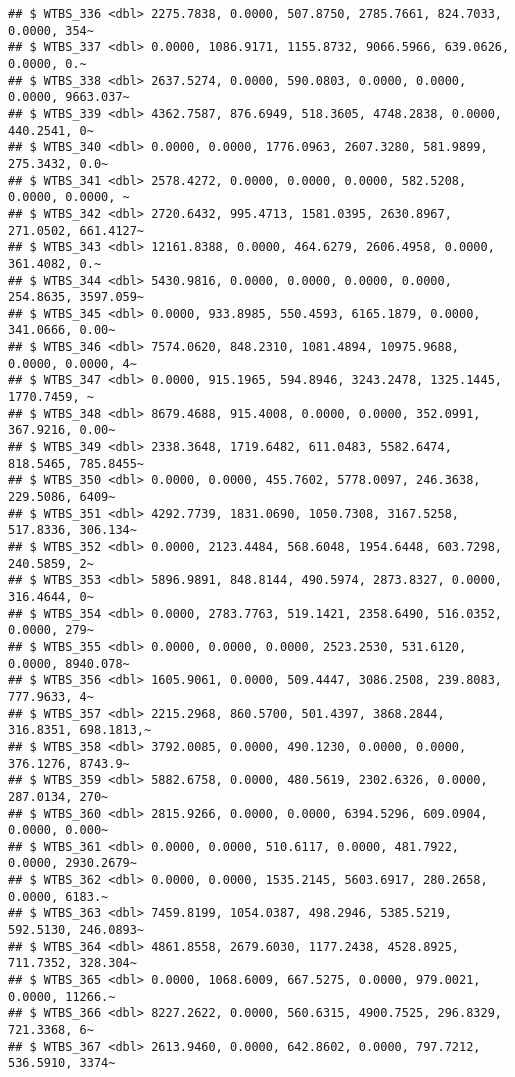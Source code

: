 \documentclass[
]{article}
\begin{document}
\begin{verbatim}
## $ WTBS_336 <dbl> 2275.7838, 0.0000, 507.8750, 2785.7661, 824.7033, 0.0000, 354~
## $ WTBS_337 <dbl> 0.0000, 1086.9171, 1155.8732, 9066.5966, 639.0626, 0.0000, 0.~
## $ WTBS_338 <dbl> 2637.5274, 0.0000, 590.0803, 0.0000, 0.0000, 0.0000, 9663.037~
## $ WTBS_339 <dbl> 4362.7587, 876.6949, 518.3605, 4748.2838, 0.0000, 440.2541, 0~
## $ WTBS_340 <dbl> 0.0000, 0.0000, 1776.0963, 2607.3280, 581.9899, 275.3432, 0.0~
## $ WTBS_341 <dbl> 2578.4272, 0.0000, 0.0000, 0.0000, 582.5208, 0.0000, 0.0000, ~
## $ WTBS_342 <dbl> 2720.6432, 995.4713, 1581.0395, 2630.8967, 271.0502, 661.4127~
## $ WTBS_343 <dbl> 12161.8388, 0.0000, 464.6279, 2606.4958, 0.0000, 361.4082, 0.~
## $ WTBS_344 <dbl> 5430.9816, 0.0000, 0.0000, 0.0000, 0.0000, 254.8635, 3597.059~
## $ WTBS_345 <dbl> 0.0000, 933.8985, 550.4593, 6165.1879, 0.0000, 341.0666, 0.00~
## $ WTBS_346 <dbl> 7574.0620, 848.2310, 1081.4894, 10975.9688, 0.0000, 0.0000, 4~
## $ WTBS_347 <dbl> 0.0000, 915.1965, 594.8946, 3243.2478, 1325.1445, 1770.7459, ~
## $ WTBS_348 <dbl> 8679.4688, 915.4008, 0.0000, 0.0000, 352.0991, 367.9216, 0.00~
## $ WTBS_349 <dbl> 2338.3648, 1719.6482, 611.0483, 5582.6474, 818.5465, 785.8455~
## $ WTBS_350 <dbl> 0.0000, 0.0000, 455.7602, 5778.0097, 246.3638, 229.5086, 6409~
## $ WTBS_351 <dbl> 4292.7739, 1831.0690, 1050.7308, 3167.5258, 517.8336, 306.134~
## $ WTBS_352 <dbl> 0.0000, 2123.4484, 568.6048, 1954.6448, 603.7298, 240.5859, 2~
## $ WTBS_353 <dbl> 5896.9891, 848.8144, 490.5974, 2873.8327, 0.0000, 316.4644, 0~
## $ WTBS_354 <dbl> 0.0000, 2783.7763, 519.1421, 2358.6490, 516.0352, 0.0000, 279~
## $ WTBS_355 <dbl> 0.0000, 0.0000, 0.0000, 2523.2530, 531.6120, 0.0000, 8940.078~
## $ WTBS_356 <dbl> 1605.9061, 0.0000, 509.4447, 3086.2508, 239.8083, 777.9633, 4~
## $ WTBS_357 <dbl> 2215.2968, 860.5700, 501.4397, 3868.2844, 316.8351, 698.1813,~
## $ WTBS_358 <dbl> 3792.0085, 0.0000, 490.1230, 0.0000, 0.0000, 376.1276, 8743.9~
## $ WTBS_359 <dbl> 5882.6758, 0.0000, 480.5619, 2302.6326, 0.0000, 287.0134, 270~
## $ WTBS_360 <dbl> 2815.9266, 0.0000, 0.0000, 6394.5296, 609.0904, 0.0000, 0.000~
## $ WTBS_361 <dbl> 0.0000, 0.0000, 510.6117, 0.0000, 481.7922, 0.0000, 2930.2679~
## $ WTBS_362 <dbl> 0.0000, 0.0000, 1535.2145, 5603.6917, 280.2658, 0.0000, 6183.~
## $ WTBS_363 <dbl> 7459.8199, 1054.0387, 498.2946, 5385.5219, 592.5130, 246.0893~
## $ WTBS_364 <dbl> 4861.8558, 2679.6030, 1177.2438, 4528.8925, 711.7352, 328.304~
## $ WTBS_365 <dbl> 0.0000, 1068.6009, 667.5275, 0.0000, 979.0021, 0.0000, 11266.~
## $ WTBS_366 <dbl> 8227.2622, 0.0000, 560.6315, 4900.7525, 296.8329, 721.3368, 6~
## $ WTBS_367 <dbl> 2613.9460, 0.0000, 642.8602, 0.0000, 797.7212, 536.5910, 3374~

\end{verbatim}
\end{document}
